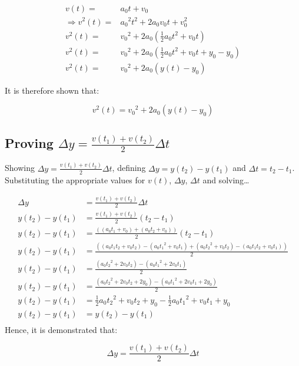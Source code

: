 \documentclass[letterpaper]{article}
\begin{document}
\begin{align}
    v(t) =& a_0t+v_0 \\
    \Rightarrow v^2(t) =& {a_0}^2 t^2 + 2a_0v_0t + v_0^2 \\
    v^2(t) =& {v_0}^2 + 2a_0 (\frac{1}{2} a_0 t^2 + v_0t) \\
    v^2(t) =& {v_0}^2 + 2a_0 (\frac{1}{2} a_0 t^2 + v_0t + y_0 - y_0) \\
    v^2(t) =& {v_0}^2 + 2a_0 (y(t) - y_0) 
\end{align}

It is therefore shown that:

\begin{equation}
    v^2(t) = {v_0}^2 + 2a_0 (y(t) - y_0) 
\end{equation}

\subsection{Proving \(\Delta y = \frac{v(t_1)+v(t_2)}{2}\Delta t\)}
\label{sec:org49c0da9}
Showing \(\Delta y = \frac{v(t_1)+v(t_2)}{2}\Delta t\), defining \(\Delta y=y(t_2)-y(t_1)\) and \(\Delta t = t_2 - t_1\). Substituting the appropriate values for \(v(t)\), \(\Delta y\), \(\Delta t\) and solving\ldots{}

\begin{align}
    \Delta y &= \frac{v(t_1)+v(t_2)}{2}\Delta t \\
    y(t_2)-y(t_1) &= \frac{v(t_1)+v(t_2)}{2} (t_2 - t_1) \\
    y(t_2)-y(t_1) &= \frac{((a_0t_1+v_0)+(a_0t_2+v_0))}{2} (t_2 - t_1) \\
    y(t_2)-y(t_1) &= \frac{((a_0t_1t_2+v_0t_2)-(a_0{t_1}^2+v_0t_1)+(a_0{t_2}^2+v_0t_2)-(a_0t_1t_2+v_0t_1))}{2} \\
    y(t_2)-y(t_1) &= \frac{(a_0{t_2}^2+2v_0t_2)-(a_0{t_1}^2+2v_0t_1)}{2} \\
    y(t_2)-y(t_1) &= \frac{(a_0{t_2}^2+2v_0t_2+2y_0)-(a_0{t_1}^2+2v_0t_1+2y_0)}{2} \\
    y(t_2)-y(t_1) &= \frac{1}{2} a_0{t_2}^2+v_0t_2+y_0 - \frac{1}{2} a_0{t_1}^2+v_0t_1+y_0 \\
    y(t_2)-y(t_1) &= y(t_2) - y(t_1) \\
\end{align}
Hence, it is demonstrated that: 

\begin{equation}
    \Delta y = \frac{v(t_1)+v(t_2)}{2}\Delta t
\end{equation}
\end{document}
